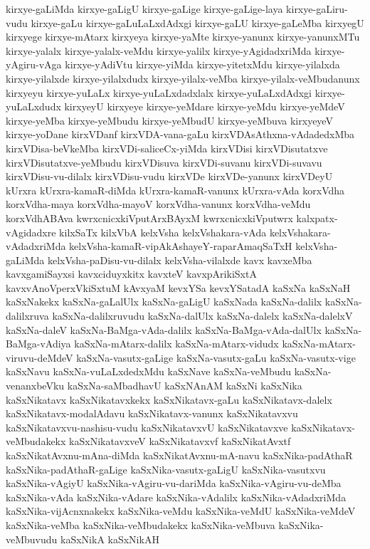 {kirxye-gaLiMda
kirxye-gaLigU
kirxye-gaLige
kirxye-gaLige-laya
kirxye-gaLiru-vudu
kirxye-gaLu
kirxye-gaLuLaLxdAdxgi
kirxye-gaLU
kirxye-gaLeMba
kirxyegU
kirxyege
kirxye-mAtarx
kirxyeya
kirxye-yaMte
kirxye-yanunx
kirxye-yanunxMTu
kirxye-yalalx
kirxye-yalalx-veMdu
kirxye-yalilx
kirxye-yAgidadxriMda
kirxye-yAgiru-vAga
kirxye-yAdiVtu
kirxye-yiMda
kirxye-yitetxMdu
kirxye-yilalxda
kirxye-yilalxde
kirxye-yilalxdudx
kirxye-yilalx-veMba
kirxye-yilalx-veMbudanunx
kirxyeyu
kirxye-yuLaLx
kirxye-yuLaLxdadxlalx
kirxye-yuLaLxdAdxgi
kirxye-yuLaLxdudx
kirxyeyU
kirxyeye
kirxye-yeMdare
kirxye-yeMdu
kirxye-yeMdeV
kirxye-yeMba
kirxye-yeMbudu
kirxye-yeMbudU
kirxye-yeMbuva
kirxyeyeV
kirxye-yoDane
kirxVDanf
kirxVDA-vana-gaLu
kirxVDAsAthxna-vAdadedxMba
kirxVDisa-beVkeMba
kirxVDi-saliceCx-yiMda
kirxVDisi
kirxVDisutatxve
kirxVDisutatxve-yeMbudu
kirxVDisuva
kirxVDi-suvanu
kirxVDi-suvavu
kirxVDisu-vu-dilalx
kirxVDisu-vudu
kirxVDe
kirxVDe-yanunx
kirxVDeyU
kUrxra
kUrxra-kamaR-diMda
kUrxra-kamaR-vanunx
kUrxra-vAda
korxVdha
korxVdha-maya
korxVdha-mayoV
korxVdha-vanunx
korxVdha-veMdu
korxVdhABAva
kwrxcnicxkiVputArxBAyxM
kwrxcnicxkiVputwrx
kalxpatx-vAgidadxre
kilxSaTx
kilxVbA
kelxVsha
kelxVshakara-vAda
kelxVshakara-vAdadxriMda
kelxVsha-kamaR-vipAkAshayeY-raparAmaqSaTxH
kelxVsha-gaLiMda
kelxVsha-paDisu-vu-dilalx
kelxVsha-vilalxde
kavx
kavxeMba
kavxgamiSayxsi
kavxciduyxkitx
kavxteV
kavxpArikiSxtA
kavxvAnoVperxVkiSxtuM
kAvxyaM
kevxYSa
kevxYSatadA
kaSxNa
kaSxNaH
kaSxNakekx
kaSxNa-gaLalUlx
kaSxNa-gaLigU
kaSxNada
kaSxNa-dalilx
kaSxNa-dalilxruva
kaSxNa-dalilxruvudu
kaSxNa-dalUlx
kaSxNa-dalelx
kaSxNa-dalelxV
kaSxNa-daleV
kaSxNa-BaMga-vAda-dalilx
kaSxNa-BaMga-vAda-dalUlx
kaSxNa-BaMga-vAdiya
kaSxNa-mAtarx-dalilx
kaSxNa-mAtarx-vidudx
kaSxNa-mAtarx-viruvu-deMdeV
kaSxNa-vasutx-gaLige
kaSxNa-vasutx-gaLu
kaSxNa-vasutx-vige
kaSxNavu
kaSxNa-vuLaLxdedxMdu
kaSxNave
kaSxNa-veMbudu
kaSxNa-venanxbeVku
kaSxNa-saMbadhavU
kaSxNAnAM
kaSxNi
kaSxNika
kaSxNikatavx
kaSxNikatavxkekx
kaSxNikatavx-gaLu
kaSxNikatavx-dalelx
kaSxNikatavx-modalAdavu
kaSxNikatavx-vanunx
kaSxNikatavxvu
kaSxNikatavxvu-nashisu-vudu
kaSxNikatavxvU
kaSxNikatavxve
kaSxNikatavx-veMbudakekx
kaSxNikatavxveV
kaSxNikatavxvf
kaSxNikatAvxtf
kaSxNikatAvxnu-mAna-diMda
kaSxNikatAvxnu-mA-navu
kaSxNika-padAthaR
kaSxNika-padAthaR-gaLige
kaSxNika-vasutx-gaLigU
kaSxNika-vasutxvu
kaSxNika-vAgiyU
kaSxNika-vAgiru-vu-dariMda
kaSxNika-vAgiru-vu-deMba
kaSxNika-vAda
kaSxNika-vAdare
kaSxNika-vAdalilx
kaSxNika-vAdadxriMda
kaSxNika-vijAcnxnakekx
kaSxNika-veMdu
kaSxNika-veMdU
kaSxNika-veMdeV
kaSxNika-veMba
kaSxNika-veMbudakekx
kaSxNika-veMbuva
kaSxNika-veMbuvudu
kaSxNikA
kaSxNikAH
}
